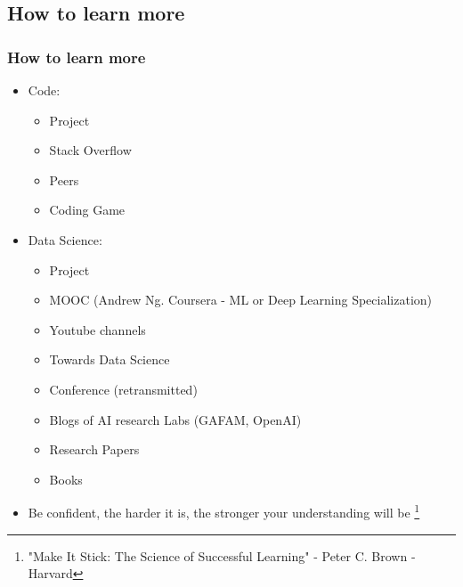 \subsection{How to learn more}
\begin{frame}\frametitle{How to learn more}
   \begin{itemize}
      \item Code:
      \begin{itemize}
         \item Project
         \item Stack Overflow
         \item Peers
         \item Coding Game
      \end{itemize}
      \item Data Science:
      \begin{itemize}
         \item Project
         \item MOOC (Andrew Ng. Coursera - ML or Deep Learning Specialization)
         \item Youtube channels
         \item Towards Data Science
         \item Conference (retransmitted)
         \item Blogs of AI research Labs (GAFAM, OpenAI)
         \item Research Papers
         \item Books
      \end{itemize}
      \item Be confident, the harder it is, the stronger your understanding will be
      \footnote{"Make It Stick: The Science of Successful Learning" - Peter C. Brown - Harvard}
   \end{itemize}
\end{frame}



